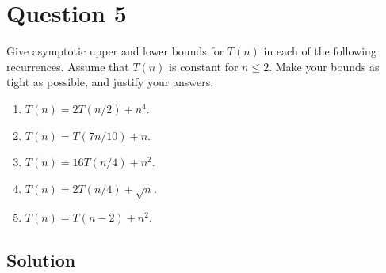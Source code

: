 
\section*{Question 5}

Give asymptotic upper and lower bounds for $T(n)$ in each of the following recurrences.
Assume that $T(n)$ is constant for $n \leq 2$.
Make your bounds as tight as possible, and justify your answers.

\begin{enumerate}[label=(\alph*)]
\item $T(n) = 2T(n/2) + n^4$.
\item $T(n) = T(7n/10) + n$.
\item $T(n) = 16T(n/4) + n^2$.
\item $T(n) = 2T(n/4) + \sqrt{n}$.
\item $T(n) = T(n-2) + n^2$.
\end{enumerate}

\subsection*{Solution}

